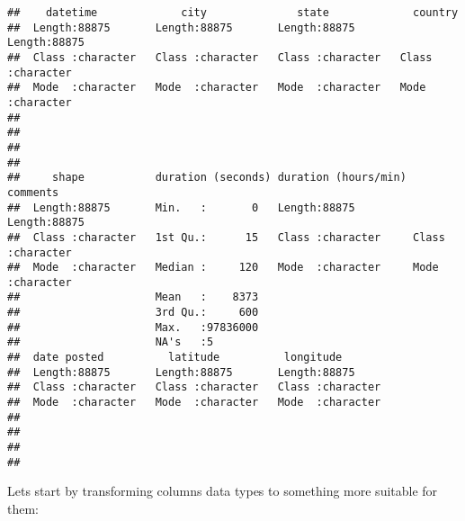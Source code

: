 \documentclass[
]{article}
\newenvironment{Shaded}{\begin{snugshade}}{\end{snugshade}}
\newcommand{\AttributeTok}[1]{\textcolor[rgb]{0.13,0.29,0.53}{#1}}
\newcommand{\FunctionTok}[1]{\textcolor[rgb]{0.13,0.29,0.53}{\textbf{#1}}}
\newcommand{\NormalTok}[1]{#1}
\newcommand{\OtherTok}[1]{\textcolor[rgb]{0.56,0.35,0.01}{#1}}
\newcommand{\SpecialCharTok}[1]{\textcolor[rgb]{0.81,0.36,0.00}{\textbf{#1}}}
\newcommand{\StringTok}[1]{\textcolor[rgb]{0.31,0.60,0.02}{#1}}
\begin{document}
\begin{verbatim}
##    datetime             city              state             country         
##  Length:88875       Length:88875       Length:88875       Length:88875      
##  Class :character   Class :character   Class :character   Class :character  
##  Mode  :character   Mode  :character   Mode  :character   Mode  :character  
##                                                                             
##                                                                             
##                                                                             
##                                                                             
##     shape           duration (seconds) duration (hours/min)   comments        
##  Length:88875       Min.   :       0   Length:88875         Length:88875      
##  Class :character   1st Qu.:      15   Class :character     Class :character  
##  Mode  :character   Median :     120   Mode  :character     Mode  :character  
##                     Mean   :    8373                                          
##                     3rd Qu.:     600                                          
##                     Max.   :97836000                                          
##                     NA's   :5                                                 
##  date posted          latitude          longitude        
##  Length:88875       Length:88875       Length:88875      
##  Class :character   Class :character   Class :character  
##  Mode  :character   Mode  :character   Mode  :character  
##                                                          
##                                                          
##                                                          
## 
\end{verbatim}

Lets start by transforming columns data types to something more suitable
for them:

\begin{Shaded}
\end{Shaded}
\end{document}
